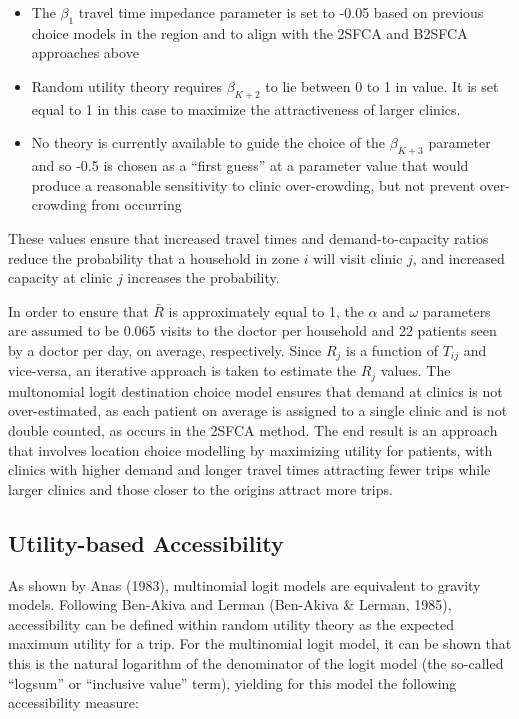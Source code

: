 \documentclass{article}
\begin{document}
\begin{itemize}
\item
  The \(\beta_1\) travel time impedance parameter is set to -0.05 based
  on previous choice models in the region and to align with the 2SFCA
  and B2SFCA approaches above
\item
  Random utility theory requires \(\beta_{K+2}\) to lie between 0 to 1
  in value. It is set equal to 1 in this case to maximize the
  attractiveness of larger clinics.
\item
  No theory is currently available to guide the choice of the
  \(\beta_{K+3}\) parameter and so -0.5 is chosen as a ``first guess''
  at a parameter value that would produce a reasonable sensitivity to
  clinic over-crowding, but not prevent over-crowding from occurring
\end{itemize}

These values ensure that increased travel times and demand-to-capacity
ratios reduce the probability that a household in zone \(i\) will visit
clinic \(j\), and increased capacity at clinic \(j\) increases the
probability.

In order to ensure that \(\bar{R}\) is approximately equal to 1, the
\(\alpha\) and \(\omega\) parameters are assumed to be 0.065 visits to
the doctor per household and 22 patients seen by a doctor per day, on
average, respectively. Since \(R_j\) is a function of \(T_{ij}\) and
vice-versa, an iterative approach is taken to estimate the \(R_j\)
values. The multonomial logit destination choice model ensures that
demand at clinics is not over-estimated, as each patient on average is
assigned to a single clinic and is not double counted, as occurs in the
2SFCA method. The end result is an approach that involves location
choice modelling by maximizing utility for patients, with clinics with
higher demand and longer travel times attracting fewer trips while
larger clinics and those closer to the origins attract more trips.

\hypertarget{utility-based-accessibility}{%
\subsection{Utility-based
Accessibility}\label{utility-based-accessibility}}

As shown by Anas (1983), multinomial logit models are equivalent to
gravity models. Following Ben-Akiva and Lerman (Ben-Akiva \& Lerman,
1985), accessibility can be defined within random utility theory as the
expected maximum utility for a trip. For the multinomial logit model, it
can be shown that this is the natural logarithm of the denominator of
the logit model (the so-called ``logsum'' or ``inclusive value'' term),
yielding for this model the following accessibility measure:
\end{document}
